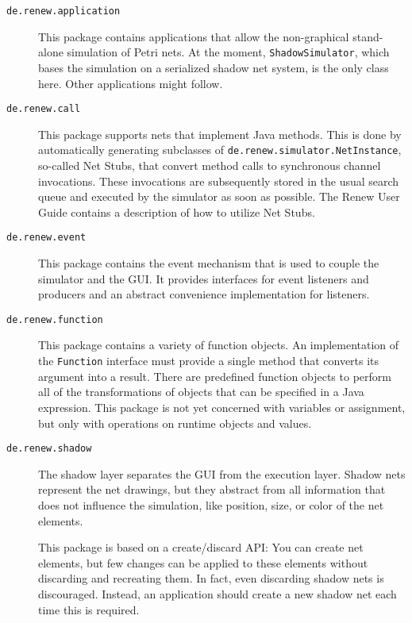 \begin{description}
\item[\texttt{de.renew.application}]
  This package contains applications that allow the non-graphical
  stand-alone simulation of Petri nets. At the moment,
  \texttt{ShadowSimulator}, which bases the simulation
  on a serialized shadow net system, is the only
  class here. Other applications might follow.
\item[\texttt{de.renew.call}] 
  This package supports nets that implement Java methods. This is done by
  automatically generating subclasses of 
  \texttt{de.renew.simulator.NetInstance}, so-called Net Stubs, that convert
  method calls to synchronous channel invocations.
  These invocations are subsequently stored in the usual search queue
  and executed by the simulator as soon as possible.
  The Renew User Guide contains a description of how to utilize Net Stubs.
\item[\texttt{de.renew.event}] 
  This package contains the event mechanism that is used to couple
  the simulator and the GUI.
  It provides interfaces for event listeners and producers and
  an abstract convenience implementation for listeners.
\item[\texttt{de.renew.function}] 
  This package contains a variety of function objects. An implementation
  of the \texttt{Function} interface must provide a single method
  that converts its argument into a result.
  There are predefined function objects to perform all of the transformations
  of objects that can be specified in a Java expression. This
  package is not yet concerned with variables or assignment,
  but only with operations on runtime objects and values.
\item[\texttt{de.renew.shadow}]
  The shadow layer separates the GUI from the
  execution layer. Shadow nets represent the net drawings, 
  but they abstract from all information that does not influence
  the simulation, like position, size, or color of the net elements.

  This package is based on a create/discard API: You can create
  net elements, but few changes can be applied to these elements
  without discarding and recreating them. In fact, even discarding
  shadow nets is discouraged. Instead, an application should create
  a new shadow net each time this is required.


\end{description}
